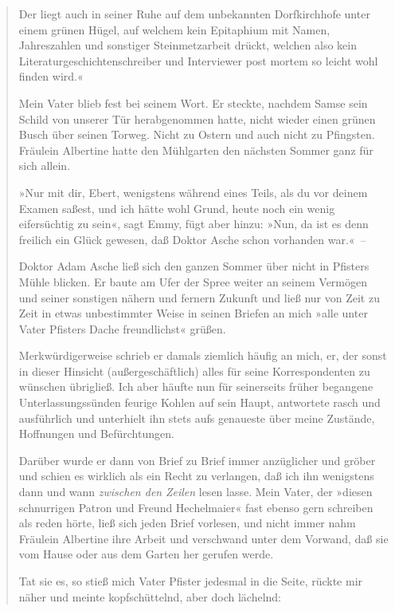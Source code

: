 \begin{verse}
Der liegt auch in seiner Ruhe auf dem unbekannten Dorfkirchhofe
unter einem grünen Hügel, auf welchem kein Epitaphium mit Namen,
Jahreszahlen und sonstiger Steinmetzarbeit drückt, welchen also
kein Literaturgeschichtenschreiber und Interviewer post mortem so
leicht wohl finden wird.«

Mein Vater blieb fest bei seinem Wort. Er steckte, nachdem Samse
sein Schild von unserer Tür herabgenommen hatte, nicht wieder einen
grünen Busch über seinen Torweg. Nicht zu Ostern und auch nicht zu
Pfingsten. Fräulein Albertine hatte den Mühlgarten den nächsten
Sommer ganz für sich allein.

»Nur mit dir, Ebert, wenigstens während eines Teils, als du vor
deinem Examen saßest, und ich hätte wohl Grund, heute noch ein
wenig eifersüchtig zu sein«, sagt Emmy, fügt aber hinzu: »Nun, da
ist es denn freilich ein Glück gewesen, daß Doktor Asche schon
vorhanden war.«~–

Doktor Adam Asche ließ sich den ganzen Sommer über nicht in
Pfisters Mühle blicken. Er baute am Ufer der Spree weiter an seinem
Vermögen und seiner sonstigen nähern und fernern Zukunft und ließ
nur von Zeit zu Zeit in etwas unbestimmter Weise in seinen Briefen
an mich »alle unter Vater Pfisters Dache freundlichst« grüßen.

Merkwürdigerweise schrieb er damals ziemlich häufig an mich, er,
der sonst in dieser Hinsicht (außergeschäftlich) alles für seine
Korrespondenten zu wünschen übrigließ. Ich aber häufte nun für
seinerseits früher begangene Unterlassungssünden feurige Kohlen auf
sein Haupt, antwortete rasch und ausführlich und unterhielt ihn
stets aufs genaueste über meine Zustände, Hoffnungen und
Befürchtungen.

Darüber wurde er dann von Brief zu Brief immer anzüglicher und
gröber und schien es wirklich als ein Recht zu verlangen, daß ich
ihn wenigstens dann und wann \emph{zwischen den} \emph{Zeilen}
lesen lasse. Mein Vater, der »diesen schnurrigen Patron und Freund
Hechelmaier« fast ebenso gern schreiben als reden hörte, ließ sich
jeden Brief vorlesen, und nicht immer nahm Fräulein Albertine ihre
Arbeit und verschwand unter dem Vorwand, daß sie vom Hause oder aus
dem Garten her gerufen werde.

Tat sie es, so stieß mich Vater Pfister jedesmal in die Seite,
rückte mir näher und meinte kopfschüttelnd, aber doch lächelnd:


\end{verse}
